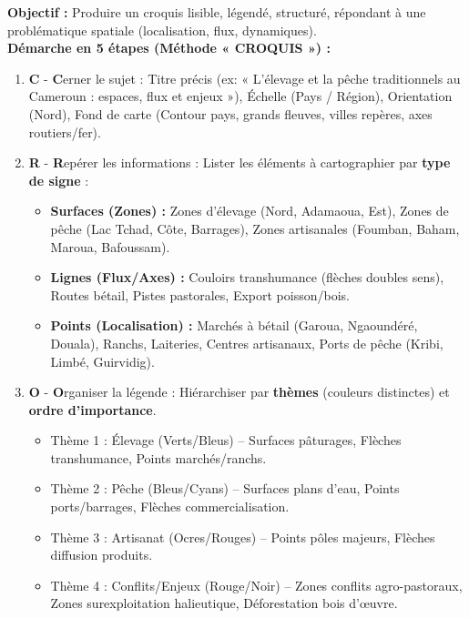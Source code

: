 \documentclass[11pt]{article}
\begin{document}
\begin{methode}
\textbf{Objectif :} Produire un croquis lisible, légendé, structuré, répondant à une problématique spatiale (localisation, flux, dynamiques).\\
\textbf{Démarche en 5 étapes (Méthode « CROQUIS ») :}
\begin{enumerate}
    \item \textbf{C} - \textbf{C}erner le sujet : Titre précis (ex: « L'élevage et la pêche traditionnels au Cameroun : espaces, flux et enjeux »), Échelle (Pays / Région), Orientation (Nord), Fond de carte (Contour pays, grands fleuves, villes repères, axes routiers/fer).
    \item \textbf{R} - \textbf{R}epérer les informations : Lister les éléments à cartographier par \textbf{type de signe} :
        \begin{itemize}
            \item \textbf{Surfaces (Zones) :} Zones d'élevage (Nord, Adamaoua, Est), Zones de pêche (Lac Tchad, Côte, Barrages), Zones artisanales (Foumban, Baham, Maroua, Bafoussam).
            \item \textbf{Lignes (Flux/Axes) :} Couloirs transhumance (flèches doubles sens), Routes bétail, Pistes pastorales, Export poisson/bois.
            \item \textbf{Points (Localisation) :} Marchés à bétail (Garoua, Ngaoundéré, Douala), Ranchs, Laiteries, Centres artisanaux, Ports de pêche (Kribi, Limbé, Guirvidig).
        \end{itemize}
    \item \textbf{O} - \textbf{O}rganiser la légende : Hiérarchiser par \textbf{thèmes} (couleurs distinctes) et \textbf{ordre d'importance}.
        \begin{itemize}
            \item Thème 1 : Élevage (Verts/Bleus) -- Surfaces pâturages, Flèches transhumance, Points marchés/ranchs.
            \item Thème 2 : Pêche (Bleus/Cyans) -- Surfaces plans d'eau, Points ports/barrages, Flèches commercialisation.
            \item Thème 3 : Artisanat (Ocres/Rouges) -- Points pôles majeurs, Flèches diffusion produits.
            \item Thème 4 : Conflits/Enjeux (Rouge/Noir) -- Zones conflits agro-pastoraux, Zones surexploitation halieutique, Déforestation bois d'œuvre.
        \end{itemize}

\end{enumerate}
\end{methode}
\end{document}
